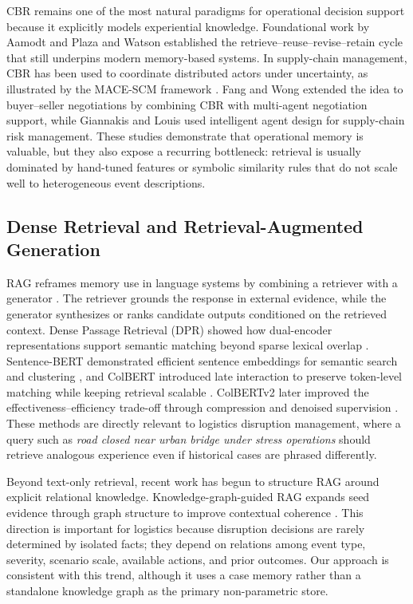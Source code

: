 \documentclass[conference]{IEEEtran}
\begin{document}
CBR remains one of the most natural paradigms for operational decision support because it explicitly models experiential knowledge. Foundational work by Aamodt and Plaza \cite{aamodt1994cbr} and Watson \cite{watson1999cbr} established the retrieve--reuse--revise--retain cycle that still underpins modern memory-based systems. In supply-chain management, CBR has been used to coordinate distributed actors under uncertainty, as illustrated by the MACE-SCM framework \cite{kwon2007mace}. Fang and Wong \cite{fang2010hybrid} extended the idea to buyer--seller negotiations by combining CBR with multi-agent negotiation support, while Giannakis and Louis \cite{giannakis2011risk} used intelligent agent design for supply-chain risk management. These studies demonstrate that operational memory is valuable, but they also expose a recurring bottleneck: retrieval is usually dominated by hand-tuned features or symbolic similarity rules that do not scale well to heterogeneous event descriptions.

\subsection{Dense Retrieval and Retrieval-Augmented Generation}

RAG reframes memory use in language systems by combining a retriever with a generator \cite{lewis2020rag}. The retriever grounds the response in external evidence, while the generator synthesizes or ranks candidate outputs conditioned on the retrieved context. Dense Passage Retrieval (DPR) showed how dual-encoder representations support semantic matching beyond sparse lexical overlap \cite{karpukhin2020dpr}. Sentence-BERT demonstrated efficient sentence embeddings for semantic search and clustering \cite{reimers2019sbert}, and ColBERT introduced late interaction to preserve token-level matching while keeping retrieval scalable \cite{khattab2020colbert}. ColBERTv2 later improved the effectiveness--efficiency trade-off through compression and denoised supervision \cite{santhanam2022colbertv2}. These methods are directly relevant to logistics disruption management, where a query such as \textit{road closed near urban bridge under stress operations} should retrieve analogous experience even if historical cases are phrased differently.

Beyond text-only retrieval, recent work has begun to structure RAG around explicit relational knowledge. Knowledge-graph-guided RAG expands seed evidence through graph structure to improve contextual coherence \cite{zhu2025kg2rag}. This direction is important for logistics because disruption decisions are rarely determined by isolated facts; they depend on relations among event type, severity, scenario scale, available actions, and prior outcomes. Our approach is consistent with this trend, although it uses a case memory rather than a standalone knowledge graph as the primary non-parametric store.
\end{document}
